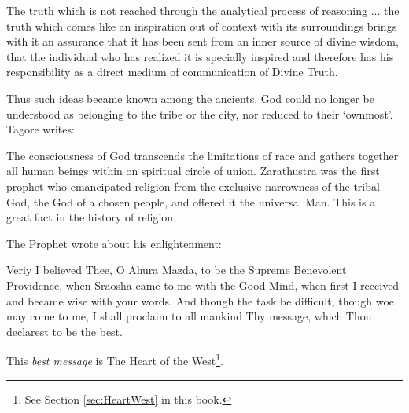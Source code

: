 \begin{quotex}
The truth which is not reached through the analytical process of reasoning ... the truth which comes like an inspiration out of context with its surroundings brings with it an assurance that it has been sent from an inner source of divine wisdom, that the individual who has realized it is specially inspired and therefore has his responsibility as a direct medium of communication of Divine Truth.
\end{quotex}


Thus such ideas became known among the ancients. God could no longer be understood as belonging to the tribe or the city, nor reduced to their `ownmost'. Tagore writes:

\begin{quotex}
The consciousness of God transcends the limitations of race and gathers together all human beings within on spiritual circle of union. Zarathustra was the first prophet who emancipated religion from the exclusive narrowness of the tribal God, the God of a chosen people, and offered it the universal Man. This is a great fact in the history of religion.
\end{quotex}


The Prophet wrote about his enlightenment:

\begin{quotex}
Veriy I believed Thee, O Ahura Mazda, to be the Supreme Benevolent Providence, when Sraosha came to me with the Good Mind, when first I received and became wise with your words. And though the task be difficult, though woe may come to me, I shall proclaim to all mankind Thy message, which Thou declarest to be the best.
\end{quotex}


This \emph{best message} is The Heart of the West\footnote{See Section \ref{sec:HeartWest} in this book.}.



